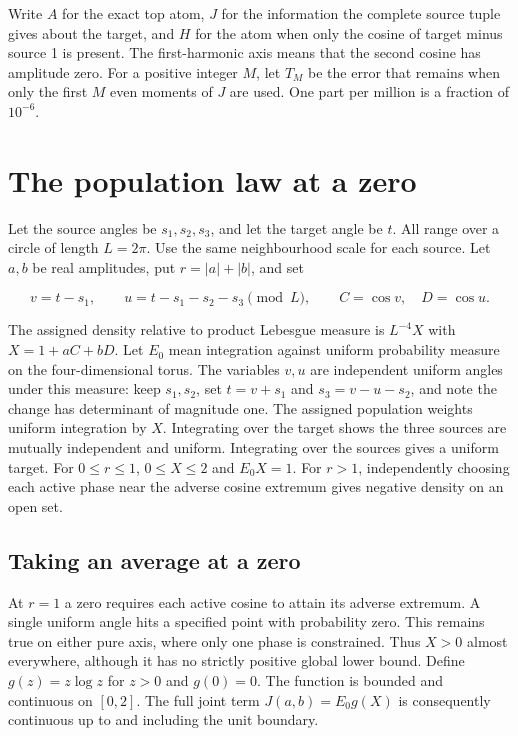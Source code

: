 Write \(A\) for the exact top atom, \(J\) for the information the complete source tuple gives about the target, and \(H\) for the atom when only the cosine of target minus source 1 is present. The first-harmonic axis means that the second cosine has amplitude zero. For a positive integer \(M\), let \(T_M\) be the error that remains when only the first \(M\) even moments of \(J\) are used. One part per million is a fraction of \(10^{-6}\).

\clearpage

\section{The population law at a zero}\label{the-population-law-at-a-zero}

Let the source angles be \(s_1,s_2,s_3\), and let the target angle be \(t\). All range over a circle of length \(L=2\pi\). Use the same neighbourhood scale for each source. Let \(a,b\) be real amplitudes, put \(r=|a|+|b|\), and set

\[
v=t-s_1,\qquad u=t-s_1-s_2-s_3\pmod L,\qquad C=\cos v,\quad D=\cos u.
\]

The assigned density relative to product Lebesgue measure is \(L^{-4}X\) with \(X=1+aC+bD\). Let \(E_0\) mean integration against uniform probability measure on the four-dimensional torus. The variables \(v,u\) are independent uniform angles under this measure: keep \(s_1,s_2\), set \(t=v+s_1\) and \(s_3=v-u-s_2\), and note the change has determinant of magnitude one. The assigned population weights uniform integration by \(X\). Integrating over the target shows the three sources are mutually independent and uniform. Integrating over the sources gives a uniform target. For \(0\le r\le1\), \(0\le X\le2\) and \(E_0X=1\). For \(r>1\), independently choosing each active phase near the adverse cosine extremum gives negative density on an open set.

\subsection{Taking an average at a zero}\label{taking-an-average-at-a-zero}

At \(r=1\) a zero requires each active cosine to attain its adverse extremum. A single uniform angle hits a specified point with probability zero. This remains true on either pure axis, where only one phase is constrained. Thus \(X>0\) almost everywhere, although it has no strictly positive global lower bound. Define \(g(z)=z\log z\) for \(z>0\) and \(g(0)=0\). The function is bounded and continuous on \([0,2]\). The full joint term \(J(a,b)=E_0g(X)\) is consequently continuous up to and including the unit boundary.

